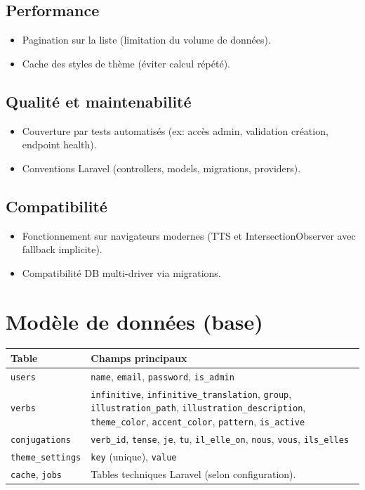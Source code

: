 \documentclass[12pt,a4paper]{article}
\begin{document}
\subsection{Performance}
\begin{itemize}[leftmargin=*]
  \item Pagination sur la liste (limitation du volume de données).
  \item Cache des styles de thème (éviter calcul répété).
\end{itemize}

\subsection{Qualité et maintenabilité}
\begin{itemize}[leftmargin=*]
  \item Couverture par tests automatisés (ex: accès admin, validation création, endpoint health).
  \item Conventions Laravel (controllers, models, migrations, providers).
\end{itemize}

\subsection{Compatibilité}
\begin{itemize}[leftmargin=*]
  \item Fonctionnement sur navigateurs modernes (TTS et IntersectionObserver avec fallback implicite).
  \item Compatibilité DB multi-driver via migrations.
\end{itemize}

\section{Modèle de données (base)}
\begin{longtable}{@{}p{3.5cm}p{11cm}@{}}
\toprule
\textbf{Table} & \textbf{Champs principaux} \\
\midrule
\endhead
\texttt{users} & \texttt{name}, \texttt{email}, \texttt{password}, \texttt{is\_admin} \\
\texttt{verbs} & \texttt{infinitive}, \texttt{infinitive\_translation}, \texttt{group}, \texttt{illustration\_path}, \texttt{illustration\_description}, \texttt{theme\_color}, \texttt{accent\_color}, \texttt{pattern}, \texttt{is\_active} \\
\texttt{conjugations} & \texttt{verb\_id}, \texttt{tense}, \texttt{je}, \texttt{tu}, \texttt{il\_elle\_on}, \texttt{nous}, \texttt{vous}, \texttt{ils\_elles} \\
\texttt{theme\_settings} & \texttt{key} (unique), \texttt{value} \\
\texttt{cache}, \texttt{jobs} & Tables techniques Laravel (selon configuration). \\
\bottomrule
\end{longtable}
\end{document}
